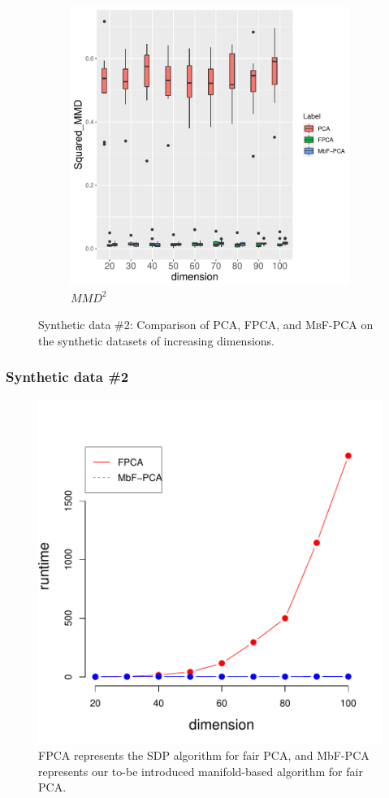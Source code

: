 \documentclass{beamer}
\begin{document}
\begin{frame}
\begin{figure}[!t]
\begin{center}
\begin{subfigure}[t]{0.49\columnwidth}
				\includegraphics[width=\linewidth]{figures/exp1-2/mmd.pdf}
				\caption{\label{fig:mmd} $MMD^2$}
			\end{subfigure}
		\end{center}
		\caption{\label{fig:exp1-2} Synthetic data \#2: Comparison of PCA, FPCA, and \textsc{MbF-PCA} on the synthetic datasets of increasing dimensions.}
	\end{figure}
\end{frame}

\begin{frame}
	\frametitle{Synthetic data \#2}
	\begin{figure}
		\centering
		\includegraphics[width=0.5\linewidth]{figures/exp1-2/runtime.pdf}
		\caption{FPCA represents the SDP algorithm for fair PCA, and MbF-PCA represents our to-be introduced manifold-based algorithm for fair PCA. \cite{Lee21}}
		\label{fig:runtime}
	\end{figure}
\end{frame}
\end{document}
